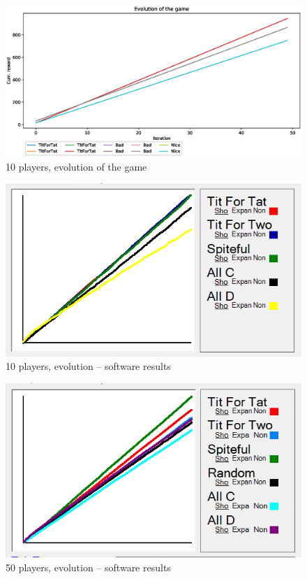 \documentclass[journal,10pt,twoside]{IEEEtran}
\begin{document}
\begin{figure}[!ht]
    \centering
	\includegraphics[width=1\columnwidth]{../img/ipdmp/ipdmp-evolution-of-game-10}
	\caption{10 players, evolution of the game}
	\label{fig:ipdmp10evo}
\end{figure}

\begin{figure}[!ht]
    \centering
	\includegraphics[width=.8\columnwidth]{../img/ipdmp/ipdmp10-plot-det}
	\caption{10 players, evolution -- software results \cite{demosw}}
	\label{fig:ipdmp10evosw}
\end{figure}

\begin{figure}[!ht]
    \centering
	\includegraphics[width=.8\columnwidth]{../img/ipdmp/ipdmp50-plot-det}
	\caption{50 players, evolution -- software results \cite{demosw}}
	\label{fig:ipdmp50evosw}
\end{figure}
\end{document}
